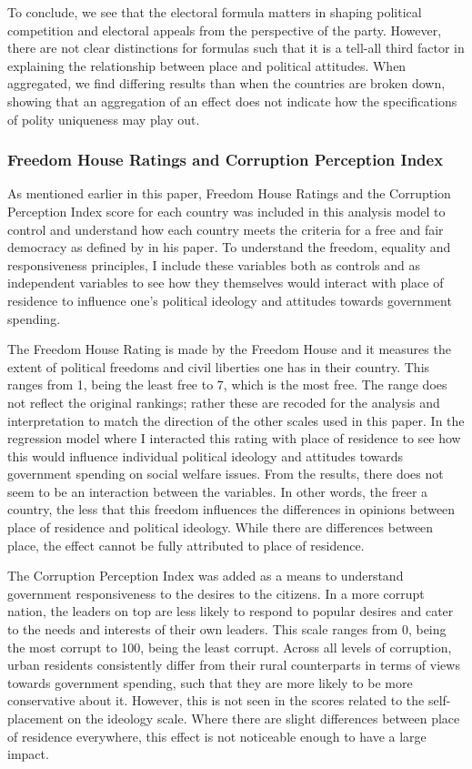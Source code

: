 \documentclass[12pt, titlepage]{article}
\begin{document}
To conclude, we see that the electoral formula matters in shaping political competition and electoral appeals from the perspective of the party. However, there are not clear distinctions for formulas such that it is a tell-all third factor in explaining the relationship between place and political attitudes. When aggregated, we find differing results than when the countries are broken down, showing that an aggregation of an effect does not indicate how the specifications of polity uniqueness may play out.

\subsubsection{Freedom House Ratings and Corruption Perception Index}

As mentioned earlier in this paper, Freedom House Ratings and the Corruption Perception Index score for each country was included in this analysis model to control and understand how each country meets the criteria for a free and fair democracy as defined by \cite{diamond2004overview} in his paper. To understand the freedom, equality and responsiveness principles, I include these variables both as controls and as independent variables to see how they themselves would interact with place of residence to influence one's political ideology and attitudes towards government spending. 

The Freedom House Rating is made by the Freedom House and it measures the extent of political freedoms and civil liberties one has in their country. This ranges from 1, being the least free to 7, which is the most free. The range does not reflect the original rankings; rather these are recoded for the analysis and interpretation to match the direction of the other scales used in this paper.  In the regression model where I interacted this rating with place of residence to see how this would influence individual political ideology and attitudes towards government spending on social welfare issues. From the results, there does not seem to be an interaction between the variables. In other words, the freer a country, the less that this freedom influences the differences in opinions between place of residence and political ideology. While there are differences between place, the effect cannot be fully attributed to place of residence.

The Corruption Perception Index was added as a means to understand government responsiveness to the desires to the citizens. In a more corrupt nation, the leaders on top are less likely to respond to popular desires and cater to the needs and interests of their own leaders. This scale ranges from 0, being the most corrupt to 100, being the least corrupt. Across all levels of corruption, urban residents consistently differ from their rural counterparts in terms of views towards government spending, such that they are more likely to be more conservative about it. However, this is not seen in the scores related to the self-placement on the ideology scale. Where there are slight differences between place of residence everywhere, this effect is not noticeable enough to have a large impact.
\end{document}
